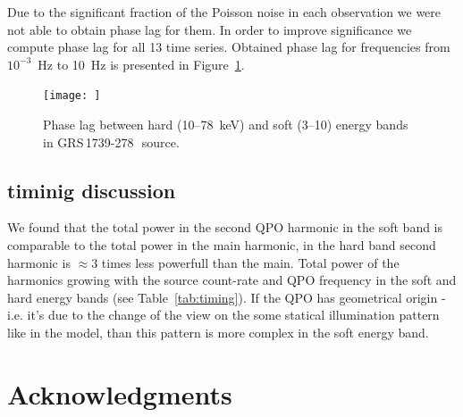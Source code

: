 \documentclass[a4paper,fleqn,usenatbib]{mnras}
\def\grs{{GRS\,1739-278\,}}
\begin{document}
Due to the significant fraction of the Poisson noise in each observation we were not able to obtain phase lag for them.
In order to improve significance we compute phase lag for all 13 time series.
Obtained phase lag for frequencies from $10^{-3}$~Hz to 10~Hz is presented in Figure~\ref{fig:phase_lag}.

\begin{figure}
        \texttt{[image: ]}
        \caption{Phase lag between hard (10--78~keV) and soft (3--10) energy bands in \grs\ source.}
        \label{fig:phase_lag}
\end{figure}

\subsection{timinig discussion}
We found that the total power in the second QPO harmonic in the soft band is comparable to the total power in the main harmonic, in the hard band second harmonic is $\approx3$ times less powerfull than the main. 
Total power of the harmonics growing with the source count-rate and QPO frequency in the soft and hard energy bands (see Table~\ref{tab:timing}). 
If the QPO has geometrical origin - i.e. it's due to the change of the view on the some statical illumination pattern like in the \citep{IVK09} model, than this pattern is more complex in the soft energy band. 


\section*{Acknowledgments}



\bsp	
\label{lastpage}
\end{document}
